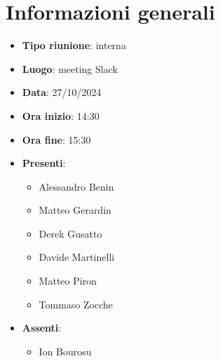 \section{Informazioni generali}
\begin{itemize}
  \item \textbf{Tipo riunione}: interna
  \item \textbf{Luogo}: meeting Slack
  \item \textbf{Data}: 27/10/2024
  \item \textbf{Ora inizio}: 14:30
  \item \textbf{Ora fine}: 15:30
  
  \item \textbf{Presenti}:
  \begin{itemize}
    \item Alessandro Benin
    \item Matteo Gerardin
    \item Derek Gusatto
    \item Davide Martinelli
    \item Matteo Piron
    \item Tommaso Zocche
  \end{itemize}

  \item \textbf{Assenti}:
  \begin{itemize}
    \item Ion Bourosu
  \end{itemize}
\end{itemize}